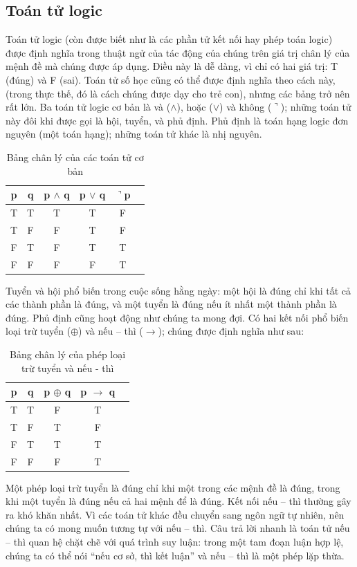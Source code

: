 \documentclass[11pt,a4paper,oneside]{article}
\begin{document}
\subsection{Toán tử logic}
Toán tử logic (còn được biết như là các phần tử kết nối hay phép toán logic) được định nghĩa trong thuật ngử của tác động của chúng trên giá trị chân lý của mệnh đề mà chúng được áp dụng. Điều này là dễ dàng, vì chỉ có hai giá trị: T (đúng) và F (sai). Toán tử số học cũng có thể được định nghĩa theo cách này, (trong thực thế, đó là cách chúng được dạy cho trẻ con), nhưng các bảng trở nên rất lớn. Ba toán tử logic cơ bản là và ($\wedge$), hoặc ($\vee$) và không ($\urcorner$); những toán tử này đôi khi được gọi là hội, tuyển, và phủ định. Phủ định là toán hạng logic đơn nguyên (một toán hạng); những toán tử khác là nhị nguyên.

\begin{table}
\centering
\caption{Bảng chân lý của các toán tử cơ bản}
\begin{tabular}{|c|c|c|c|c|l|} 
\hline p&q&p $\wedge$ q&p $\vee$ q&$\urcorner$p\\ 
\hline T&T&T&T&F\\ 
\hline T&F&F&T&F\\ 
\hline F&T&F&T&T\\ 
\hline F&F&F&F&T\\
\hline\end{tabular}
\end{table}

Tuyển và hội phổ biến trong cuộc sống hằng ngày: một hội là đúng chỉ khi tất cả các thành phần là đúng, và một tuyển là đúng nếu ít nhất một thành phần là đúng. Phủ định cũng hoạt động như chúng ta mong đợi. Có hai kết nối phổ biến loại trừ tuyển ($\oplus$) và nếu – thì ($\rightarrow$); chúng được định nghĩa như sau:

\begin{table}
\centering
\caption{Bảng chân lý của phép loại trừ tuyển và nếu - thì}
\begin{tabular}{|c|c|c|c|l|} 
\hline p&q&p $\oplus$ q&p $\rightarrow$ q\\ 
\hline T&T&F&T\\ 
\hline T&F&T&F\\ 
\hline F&T&T&T\\ 
\hline F&F&F&T\\
\hline\end{tabular}
\end{table}

Một phép loại trừ tuyển là đúng chỉ khi một trong các mệnh đề là đúng, trong khi một tuyển là đúng nếu cả hai mệnh để là đúng. Kết nối nếu – thì thường gây ra khó khăn nhất. Vì các toán tử khác đều chuyển sang ngôn ngữ tự nhiên, nên chúng ta có mong muốn tương tự với nếu – thì. Câu trả lời nhanh là toán tử nếu – thì quan hệ chặt chẽ với quá trình suy luận: trong một tam đoạn luận hợp lệ, chúng ta có thể nói “nếu cơ sở, thì kết luận” và nếu – thì là một phép lặp thừa.
\end{document}
